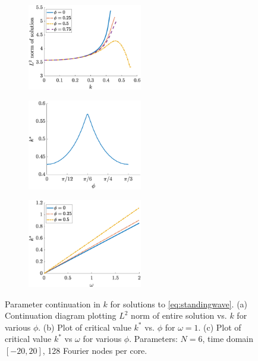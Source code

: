 \documentclass[11pt,reqno]{amsart}
\begin{document}
\begin{figure}
    \centering
    \begin{subfigure}{0.3\linewidth}
        \caption{}
        \label{fig:kcont2a}
        \includegraphics[width=5cm]{contkL2norm.eps}
    \end{subfigure}
    \begin{subfigure}{0.3\linewidth}
        \caption{}
        \label{fig:kcont2b}
        \includegraphics[width=5cm]{contkstarvsphi.eps}
    \end{subfigure}
    \begin{subfigure}{0.3\linewidth}
        \caption{}
        \label{fig:kcont2c}
        \includegraphics[width=5cm]{contkstarvsomega.eps}
    \end{subfigure}
    \caption{Parameter continuation in $k$ for solutions to \cref{eq:standingwave}. (a) Continuation diagram plotting $L^2$ norm of entire solution vs. $k$ for various $\phi$. (b) Plot of critical value $k^*$ vs. $\phi$ for $\omega = 1$. (c) Plot of critical value $k^*$ vs $\omega$ for various $\phi$. Parameters: $N=6$, time domain $[-20,20]$, 128 Fourier nodes per core.}
    \label{fig:kcont2}
\end{figure}
\end{document}

